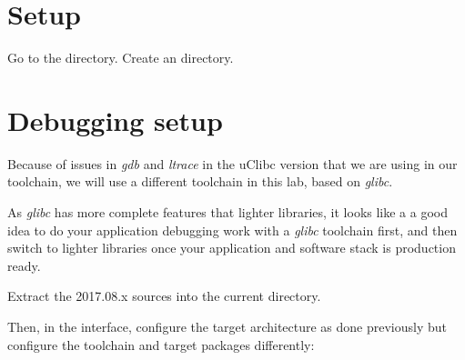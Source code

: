 
\section{Setup}

Go to the  directory.
Create an  directory.

\section{Debugging setup}

Because of issues in {\em gdb} and {\em ltrace} in the uClibc version
that we are using in our toolchain, we will use a different toolchain
in this lab, based on {\em glibc}. 

As {\em glibc} has more complete features that lighter libraries,
it looks like a a good idea to do your application debugging work
with a {\em glibc} toolchain first, and then switch to lighter libraries
once your application and software stack is production ready. 

Extract the 2017.08.x sources into the current directory.

Then, in the  interface, configure the target
architecture as done previously but configure the toolchain and
target packages differently:

